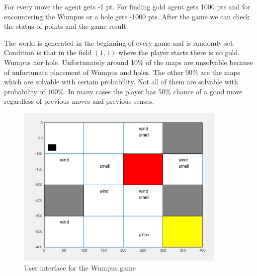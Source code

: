 \documentclass[a4paper]{article}
\begin{document}
	 For every move the agent gets -1 pt. For finding gold agent gets 1000 pts and for encountering the Wumpus or a hole gets -1000 pts. After the game we can check the status of points and the game result.
	 
The world is generated in the beginning of every game and is randomly set. Condition is that in the field $(1,1)$ where the player starts there is no gold, Wumpus nor hole. Unfortunately around 10\%  of the maps are unsolvable because of unfortunate placement of Wumpus and holes. The other 90\%  are the maps which are solvable with certain probability. Not all of them are solvable with probability of $100\%$. In many cases the player has 50\% chance of a good move regardless of previous moves and previous senses.
	 
	 
	  \begin{figure}[!h]
		\centering	
		\includegraphics[width=0.9\textwidth]{pic/gui.png}
		\caption{User interface for the Wumpus game}
		\label{pic:gui}
	\end{figure}
\end{document}
